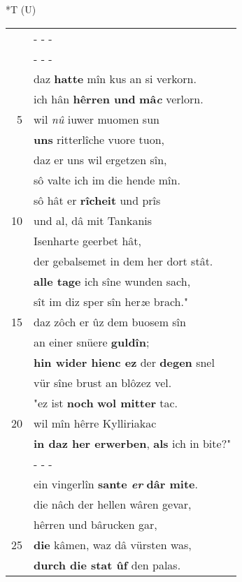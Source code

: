 \documentclass[8pt,a4paper,notitlepage]{article}
\begin{document}
\begin{table}[ht]
\begin{minipage}[t]{0.5\linewidth}
\end{minipage}
\hspace{0.5cm}
\begin{minipage}[t]{0.5\linewidth}
\small
\begin{center}*T (U)
\end{center}
\begin{tabular}{rl}
 & \multicolumn{1}{l}{ - - - }\\ 
 & \multicolumn{1}{l}{ - - - }\\ 
 & daz \textbf{hatte} mîn kus an si verkorn.\\ 
 & ich hân \textbf{hêrren und} \textbf{mâ\textit{c}} verlorn.\\ 
5 & wil \textit{nû} iuwer muomen sun\\ 
 & \textbf{uns} ritterlîche vuore tuon,\\ 
 & daz er uns wil ergetzen sîn,\\ 
 & sô valte ich im die hende mîn.\\ 
 & sô hât er \textbf{rîcheit} und prîs\\ 
10 & und al, dâ mit Tankanis\\ 
 & Isenharte geerbet hât,\\ 
 & der gebalsemet in dem her dort stât.\\ 
 & \textbf{alle tage} ich sîne wunden sach,\\ 
 & sît im diz sper sîn her\textit{z}e brach."\\ 
15 & daz zôch er ûz dem buosem sîn\\ 
 & an einer snüere \textbf{guldîn};\\ 
 & \textbf{hin wider hienc ez} der \textbf{degen} snel\\ 
 & vür sîne brust an blôzez vel.\\ 
 & "ez ist \textbf{noch} \textbf{wol mitter} tac.\\ 
20 & wil mîn hêrre Kylliriakac\\ 
 & \textbf{in daz her erwerben}, \textbf{als} ich in bite?"\\ 
 & \multicolumn{1}{l}{ - - - }\\ 
 & ein vingerlîn \textbf{sante \textit{er}} \textbf{dâr mite}.\\ 
 & die nâch der hellen wâren gevar,\\ 
 & hêrren und bârucken gar,\\ 
25 & \textbf{die} kâmen, waz dâ vürsten was,\\ 
 & \textbf{durch die stat ûf} den palas.\\ 

\end{tabular}
\end{minipage}
\end{table}
\end{document}
